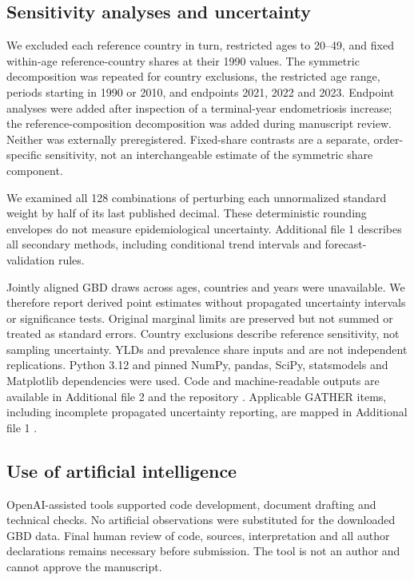 \documentclass[11pt,a4paper]{article}
\begin{document}

\subsection{Sensitivity analyses and uncertainty}
We excluded each reference country in turn, restricted ages to 20--49, and fixed within-age reference-country shares at their 1990 values. The symmetric decomposition was repeated for country exclusions, the restricted age range, periods starting in 1990 or 2010, and endpoints 2021, 2022 and 2023. Endpoint analyses were added after inspection of a terminal-year endometriosis increase; the reference-composition decomposition was added during manuscript review. Neither was externally preregistered. Fixed-share contrasts are a separate, order-specific sensitivity, not an interchangeable estimate of the symmetric share component.



We examined all 128 combinations of perturbing each unnormalized standard weight by half of its last published decimal. These deterministic rounding envelopes do not measure epidemiological uncertainty. Additional file 1 describes all secondary methods, including conditional trend intervals and forecast-validation rules.

Jointly aligned GBD draws across ages, countries and years were unavailable. We therefore report derived point estimates without propagated uncertainty intervals or significance tests. Original marginal limits are preserved but not summed or treated as standard errors. Country exclusions describe reference sensitivity, not sampling uncertainty. YLDs and prevalence share inputs and are not independent replications. Python 3.12 and pinned NumPy, pandas, SciPy, statsmodels and Matplotlib dependencies were used. Code and machine-readable outputs are available in Additional file 2 and the repository \cite{repository}. Applicable GATHER items, including incomplete propagated uncertainty reporting, are mapped in Additional file 1 \cite{gather}.

\subsection{Use of artificial intelligence}
OpenAI-assisted tools supported code development, document drafting and technical checks. No artificial observations were substituted for the downloaded GBD data. Final human review of code, sources, interpretation and all author declarations remains necessary before submission. The tool is not an author and cannot approve the manuscript.
\end{document}
